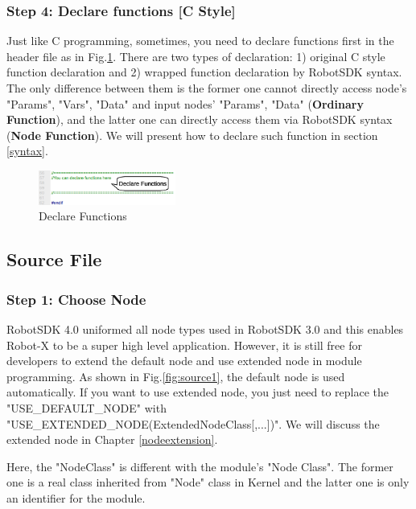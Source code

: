 \documentclass[a4paper,10pt]{book}
\begin{document}
\subsubsection{Step 4: Declare functions [C Style]} \label{declfunc}

Just like C programming, sometimes, you need to declare functions first in the header file as in Fig.\ref{fig:header4}. There are two types of declaration: 1) original C style function declaration and 2) wrapped function declaration by RobotSDK syntax. The only difference between them is the former one cannot directly access node's "Params", "Vars", "Data" and input nodes' "Params", "Data" ({\bf{Ordinary Function}}), and the latter one can directly access them via RobotSDK syntax ({\bf{Node Function}}). We will present how to declare such function in section \ref{syntax}.

\begin{figure}
 \centering
 \includegraphics[width=0.4\textwidth]{img/header4.eps}
 \caption{Declare Functions}
 \label{fig:header4}
\end{figure}

\subsection{Source File}

\subsubsection{Step 1: Choose Node}

RobotSDK 4.0 uniformed all node types used in RobotSDK 3.0 and this enables Robot-X to be a super high level application. However, it is still free for developers to extend the default node and use extended node in module programming. As shown in Fig.\ref{fig:source1}, the default node is used automatically. If you want to use extended node, you just need to replace the "USE\_DEFAULT\_NODE" with "USE\_EXTENDED\_NODE(ExtendedNodeClass[,...])". We will discuss the extended node in Chapter \ref{nodeextension}.

\begin{framed}
 Here, the "NodeClass" is different with the module's "Node Class". The former one is a real class inherited from "Node" class in Kernel and the latter one is only an identifier for the module.
\end{framed}
\end{document}
